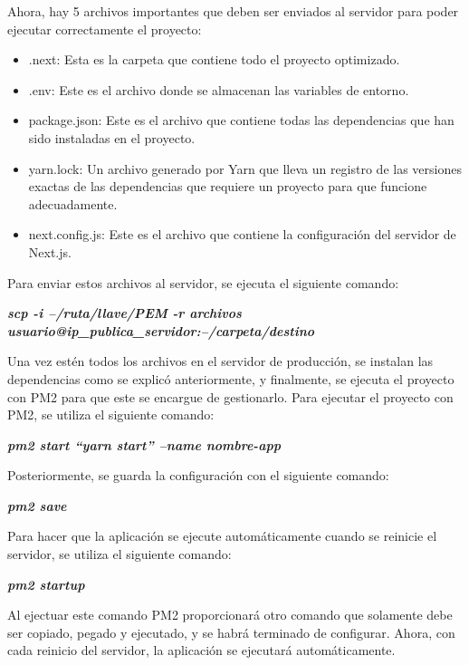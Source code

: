 Ahora, hay 5 archivos importantes que deben ser enviados al servidor para poder ejecutar correctamente el proyecto:
    \begin{itemize}
        \item .next: Esta es la carpeta que contiene todo el proyecto optimizado.
        \item .env: Este es el archivo donde se almacenan las variables de entorno.
        \item package.json: Este es el archivo que contiene todas las dependencias que han sido instaladas en el proyecto.
        \item yarn.lock: Un archivo generado por Yarn que lleva un registro de las versiones exactas de las dependencias que requiere un proyecto para que funcione adecuadamente.
        \item next.config.js: Este es el archivo que contiene la configuración del servidor de Next.js.
    \end{itemize}
Para enviar estos archivos al servidor, se ejecuta el siguiente comando:
    \begin{center}
        \textbf{
            \emph{
                scp -i --/ruta/llave/PEM -r archivos usuario@ip\_{}publica\_{}servidor:--/carpeta/destino
                }
            }
    \end{center}
Una vez estén todos los archivos en el servidor de producción, se instalan las dependencias como se explicó anteriormente, y finalmente, se ejecuta el proyecto con PM2 para que este se encargue de gestionarlo. Para ejecutar el proyecto con PM2, se utiliza el siguiente comando:
    \begin{center}
        \textbf{
            \emph{
                pm2 start ``yarn start'' --name nombre-app
                }
            }
    \end{center}
Posteriormente, se guarda la configuración con el siguiente comando:
    \begin{center}
        \textbf{
            \emph{
                pm2 save
                }
            }
    \end{center}
Para hacer que la aplicación se ejecute automáticamente cuando se reinicie el servidor, se utiliza el siguiente comando:
    \begin{center}
        \textbf{
            \emph{
                pm2 startup
                }
            }
    \end{center}
Al ejectuar este comando PM2 proporcionará otro comando que solamente debe ser copiado, pegado y ejecutado, y se habrá terminado de configurar. Ahora, con cada reinicio del servidor, la aplicación se ejecutará automáticamente.

